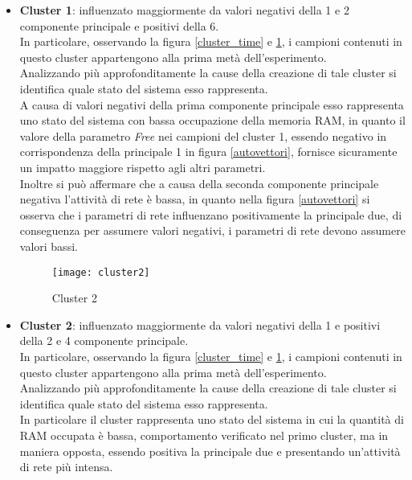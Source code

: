 \begin{itemize}

  \begin{figure}[!htbp]
    \centering
    \texttt{[image: cluster1]}
    \caption{Grafico 3D del Cluster 1}
    \label{cluster1}
  \end{figure}

  \item \textbf{Cluster 1}: influenzato maggiormente da valori negativi della
  1 e 2 componente principale e positivi della 6.\\
  In particolare, osservando la figura \ref{cluster_time} e \ref{cluster1}, i campioni contenuti
  in questo cluster appartengono alla prima metà dell'esperimento.\\
  Analizzando più approfonditamente la cause della creazione di tale cluster si
  identifica quale stato del sistema esso rappresenta.\\
  A causa di valori negativi della prima componente principale esso
  rappresenta uno stato del sistema con bassa occupazione della memoria RAM,
  in quanto il valore della parametro \textit{Free} nei campioni del cluster 1,
  essendo negativo in corrispondenza della principale 1 in figura \ref{autovettori},
  fornisce sicuramente un impatto maggiore rispetto agli altri parametri.\\
  Inoltre si può affermare che a causa della seconda componente principale negativa
  l'attività di rete è bassa, in quanto nella figura \ref{autovettori} si osserva
  che i parametri di rete influenzano positivamente la principale due, di conseguenza
  per assumere valori negativi, i parametri di rete devono assumere valori bassi.

  \clearpage

  \begin{figure}[!htbp]
    \centering
    \texttt{[image: cluster2]}
    \caption{Cluster 2}
    \label{cluster2}
  \end{figure}

  \item \textbf{Cluster 2}: influenzato maggiormente da valori negativi della
  1 e positivi della 2 e 4 componente principale.\\
  In particolare, osservando la figura \ref{cluster_time} e \ref{cluster1}, i campioni contenuti
  in questo cluster appartengono alla prima metà dell'esperimento.\\
  Analizzando più approfonditamente la cause della creazione di tale cluster si
  identifica quale stato del sistema esso rappresenta.\\
  In particolare il cluster rappresenta uno stato del sistema in cui la quantità di RAM occupata
  è bassa, comportamento verificato nel primo cluster, ma in maniera opposta,
  essendo positiva la principale due e presentando un'attività di rete più intensa.


\end{itemize}
